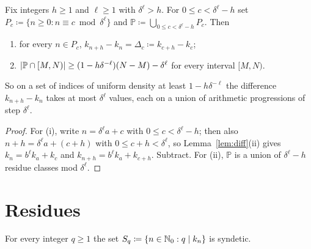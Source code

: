 \begin{lemma}
  \label{lem:differences}
  \leanok
  Fix integers $h \geq 1$ and $\ell \geq 1$ with $\delta^\ell > h$.  For
  $0 \leq c < \delta^\ell - h$ set $P_c \coloneqq \{ n \geq 0 : n \equiv c \bmod \delta^\ell \}$
  and $\mathbb{P} \coloneqq \bigcup_{0 \leq c < \delta^\ell - h} P_c$.  Then
  \begin{enumerate}
    \item[(i)] for every $n \in P_c$, $k_{n+h} - k_n = \Delta_c \coloneqq k_{c+h} - k_c$;
    \item[(ii)] $\lvert \mathbb{P} \cap [M,N) \rvert \geq (1 - h\delta^{-\ell})(N-M) - \delta^\ell$ for every
      interval $[M,N)$.
  \end{enumerate}
  So on a set of indices of uniform density at least $1 - h\delta^{-\ell}$ the difference
  $k_{n+h} - k_n$ takes at most $\delta^\ell$ values, each on a union of arithmetic progressions
  of step $\delta^\ell$.
\end{lemma}

\begin{proof}
  \leanok
  For (i), write $n = \delta^\ell a + c$ with $0 \leq c < \delta^\ell - h$; then also
  $n + h = \delta^\ell a + (c+h)$ with $0 \leq c+h < \delta^\ell$, so Lemma~\ref{lem:diff}(ii)
  gives $k_n = b^\ell k_a + k_c$ and $k_{n+h} = b^\ell k_a + k_{c+h}$.  Subtract.
  For (ii), $\mathbb{P}$ is a union of $\delta^\ell - h$ residue classes mod $\delta^\ell$.
\end{proof}

\section{Residues}

\begin{lemma}
  \label{lem:syndetic-residues}
  \leanok
  For every integer $q \geq 1$ the set $S_q \coloneqq \{ n \in \mathbb{N}_0 : q \mid k_n \}$ is syndetic.
\end{lemma}

